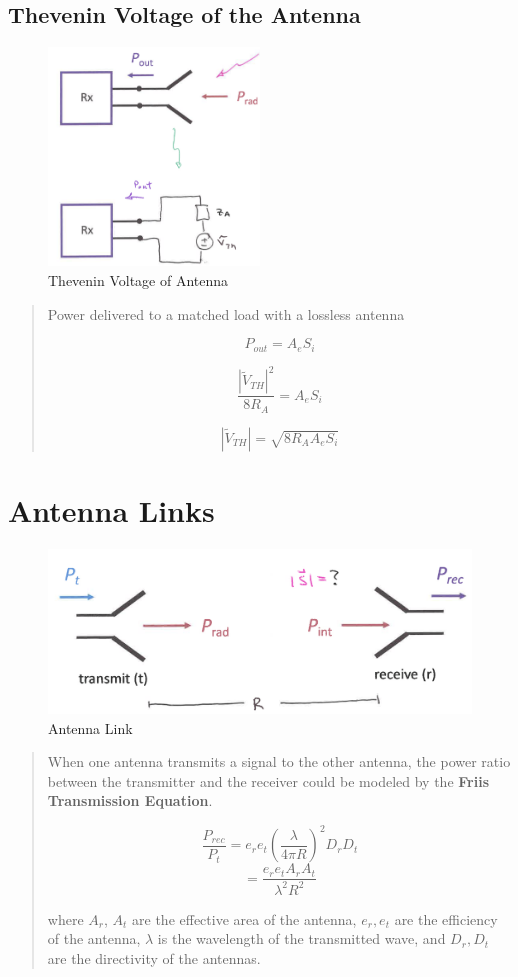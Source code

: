 \documentclass{article} %
\begin{document}
\subsection{Thevenin Voltage of the Antenna}
\begin{figure}[H]
    \centering
    \includegraphics[width=0.5\textwidth]{./image/figure7.png}
    \caption{Thevenin Voltage of Antenna}
\end{figure}
\begin{quote}
    Power delivered to a matched load with a lossless antenna

    \[P_{out} = A_e S_i\]

    \[\frac{|\tilde{V}_{TH}|^2}{8R_A} = A_e S_i\]

    \[|\tilde{V}_{TH}| = \sqrt{8 R_A A_e S_i}\]
\end{quote}

\section{Antenna Links}

\begin{figure}[H]
    \centering
    \includegraphics[width=1\textwidth]{./image/figure8.png}
    \caption{Antenna Link}
\end{figure}

\begin{quote}
    When one antenna transmits a signal to the other antenna, the power ratio between the transmitter and the receiver could be modeled by the \textbf{Friis Transmission Equation}.

    \[\frac{P_{rec}}{P_{t}} = e_r e_t \left(\frac{\lambda}{4\pi R}\right)^2 D_r D_t\]
    \[= \frac{e_r e_t A_r A_t}{\lambda^2 R^2}\]

    where $A_r$, $A_t$ are the effective area of the antenna, $e_r, e_t$ are the efficiency of the antenna, $\lambda$ is the wavelength of the transmitted wave, and $D_r, D_t$ are the directivity of the antennas.


\end{quote}
\end{document}
